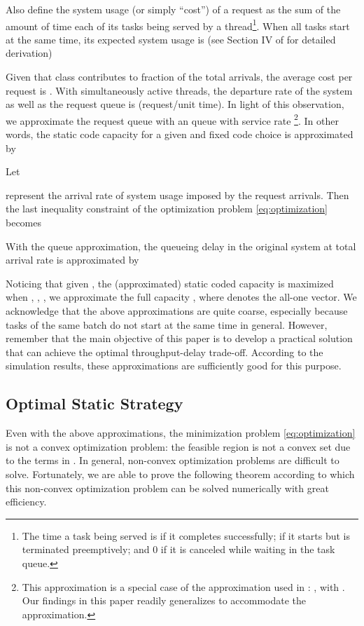 \documentclass[journal]{IEEEtran}
\begin{document}
Also define the system usage (or simply ``cost'') of a request as the sum of the amount of time each of its tasks being served by a thread\footnote{The time a task  being served is  if it completes successfully;  if it starts but is terminated preemptively; and 0 if it is canceled while waiting in the task queue.}. When all tasks start at the same time, its expected system usage is (see Section IV of \cite{fastcloud} for detailed derivation)

Given that class  contributes to  fraction of the total arrivals, the average cost per request is . With  simultaneously active threads, the departure rate of the system as well as the request queue is   (request/unit time). In light of this observation, we approximate the request queue with an  queue with service rate 
\footnote{This  approximation is a special case of the  approximation used in \cite{fastcloud}: , with . Our findings in this paper readily generalizes to accommodate the  approximation.
}.
In other words, the static code capacity for a given  and fixed code choice  is approximated by

Let

represent the arrival rate of system usage imposed by the request arrivals. Then the last inequality constraint of the optimization  problem \eqref{eq:optimization} becomes 



With the  queue approximation, the queueing delay in the original system at total arrival rate  is approximated by




Noticing that given , the (approximated) static coded capacity  is maximized when , , , we approximate the full capacity , where  denotes the all-one vector. We acknowledge that the above approximations are quite coarse, especially because tasks of the same batch do not start at the same time in general.  However, remember that the main objective of this paper is to develop a practical solution that can achieve the optimal throughput-delay trade-off. According to the simulation results, these approximations are sufficiently good for this purpose.

\subsection{Optimal Static Strategy}
\label{ssec:ana:optStatic}


Even with the above approximations, the minimization problem \eqref{eq:optimization} is
not a convex optimization problem: the feasible region is not a convex set due to the  terms in . In general, non-convex optimization problems are difficult to solve. Fortunately, we are able to prove the following theorem according to which this non-convex optimization problem can be solved numerically with great  efficiency.
\end{document}
